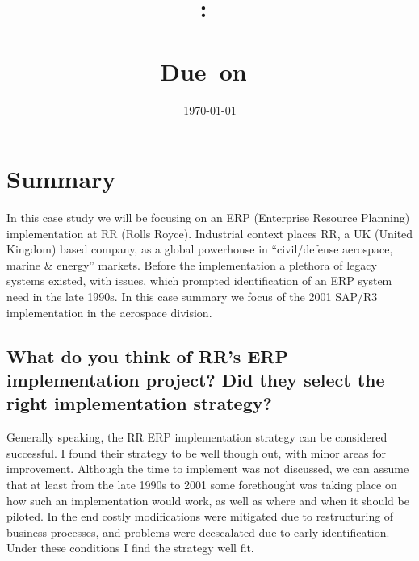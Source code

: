 \documentclass{article}
\title{
    \vspace{2in}
    \textmd{\textbf{\hmwkClass:\ \\ \hmwkTitle}}\\
    \normalsize\vspace{0.1in}\small{Due\ on\ \hmwkDueDate}\\
    \vspace{0.1in}\Large{\textit{\paprTitle}}
    \vspace{3in}
}
\author{\hmwkAuthorName}
\date{\today}
\begin{document}
\maketitle

\pagebreak

\tableofcontents
\newpage

\section{Summary}
In this case study we will be focusing on an ERP (Enterprise Resource Planning) implementation at RR (Rolls Royce). 
Industrial context places RR, a UK (United Kingdom) based company, as a global powerhouse in ``civil/defense aerospace, marine \& energy'' markets. 
Before the implementation a plethora of legacy systems existed, with issues, which prompted identification of an ERP system need in the late 1990s. 
In this case summary we focus of the 2001 SAP/R3 implementation in the aerospace division. 

\subsection{What do you think of RR's ERP implementation project? Did they select the right
implementation strategy?}
Generally speaking, the RR ERP implementation strategy can be considered successful. 
I found their strategy to be well though out, with minor areas for improvement. 
Although the time to implement was not discussed, we can assume that at least from the late 1990s to 2001 some forethought was taking place on how such an implementation would work, as well as where and when it should be piloted. 
In the end costly modifications were mitigated due to restructuring of business processes, and problems were deescalated due to early identification. 
Under these conditions I find the strategy well fit. 
\end{document}

